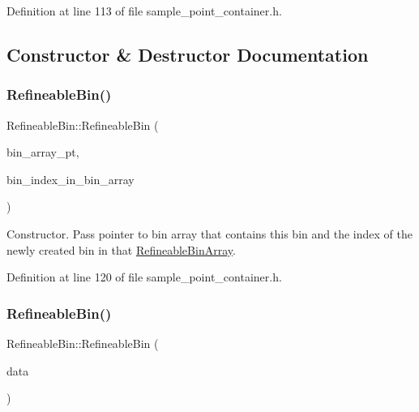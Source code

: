 Definition at line 113 of file sample\+\_\+point\+\_\+container.\+h.



\subsection{Constructor \& Destructor Documentation}
\mbox{\label{classRefineableBin_ab840fa275927998ba2f51ec7ef46235c}} 
\subsubsection{\texorpdfstring{Refineable\+Bin()}{RefineableBin()}\hspace{0.1cm}{\footnotesize\ttfamily [1/2]}}
{\footnotesize\ttfamily Refineable\+Bin\+::\+Refineable\+Bin (\begin{DoxyParamCaption}\item[{\hyperlink{classRefineableBinArray}{Refineable\+Bin\+Array} $\ast$}]{bin\+\_\+array\+\_\+pt,  }\item[{const unsigned \&}]{bin\+\_\+index\+\_\+in\+\_\+bin\+\_\+array }\end{DoxyParamCaption})\hspace{0.3cm}{\ttfamily [inline]}}



Constructor. Pass pointer to bin array that contains this bin and the index of the newly created bin in that \hyperlink{classRefineableBinArray}{Refineable\+Bin\+Array}. 



Definition at line 120 of file sample\+\_\+point\+\_\+container.\+h.

\mbox{\label{classRefineableBin_a41875de39485fe116c5e22dcea65f3ab}} 
\subsubsection{\texorpdfstring{Refineable\+Bin()}{RefineableBin()}\hspace{0.1cm}{\footnotesize\ttfamily [2/2]}}
{\footnotesize\ttfamily Refineable\+Bin\+::\+Refineable\+Bin (\begin{DoxyParamCaption}\item[{const \hyperlink{classRefineableBin}{Refineable\+Bin} \&}]{data }\end{DoxyParamCaption})\hspace{0.3cm}{\ttfamily [inline]}}



